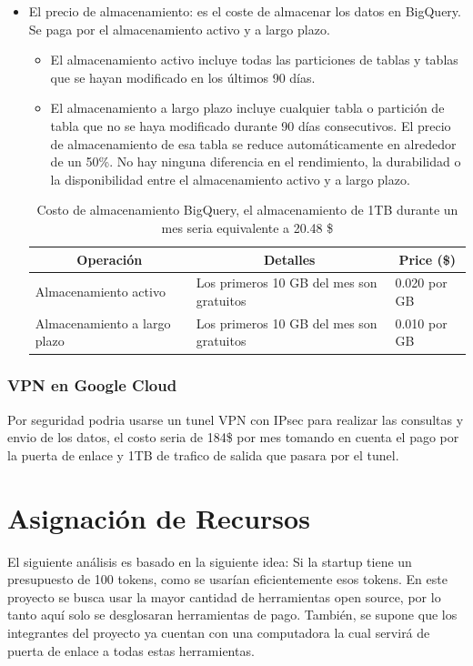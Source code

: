 \documentclass[12pt,a4paper,openright]{article}
\begin{document}
\begin{itemize}
\item El precio de almacenamiento: es el coste de almacenar los datos en BigQuery. Se paga por el almacenamiento activo y a largo plazo.
\begin{itemize}
    \item El almacenamiento activo incluye todas las particiones de tablas y tablas que se hayan modificado en los últimos 90 días.
    \item El almacenamiento a largo plazo incluye cualquier tabla o partición de tabla que no se haya modificado durante 90 días consecutivos. El precio de almacenamiento de esa tabla se reduce automáticamente en alrededor de un 50\%. No hay ninguna diferencia en el rendimiento, la durabilidad o la disponibilidad entre el almacenamiento activo y a largo plazo.
\end{itemize}
\begin{table}[ht]
\begin{adjustbox}{width=\textwidth}
\begin{tabular}{|l|l|l|}
\hline
\multicolumn{1}{|c|}{\textbf{Operación}} & \multicolumn{1}{c|}{\textbf{Detalles}}   & \multicolumn{1}{c|}{\textbf{Price (\$)}} \\ \hline \hline
Almacenamiento activo                    & Los primeros 10 GB del mes son gratuitos & 0.020 por GB                             \\ \hline
Almacenamiento a largo plazo             & Los primeros 10 GB del mes son gratuitos & 0.010 por GB                             \\ \hline
\end{tabular}
\end{adjustbox}
\caption{Costo de almacenamiento BigQuery, el almacenamiento de 1TB durante un mes seria equivalente a 20.48 \$}
\end{table}
\end{itemize}

\subsubsection{VPN en Google Cloud}
Por seguridad podria usarse un tunel VPN con IPsec para realizar las consultas y envio de los datos, el costo seria de 184\$ por mes tomando en cuenta el pago por la puerta de enlace y 1TB de trafico de salida que pasara por el tunel.

\section{Asignaci\'on de Recursos}
El siguiente análisis es basado en la siguiente idea: Si la startup tiene un presupuesto de 100 tokens, como se usarían eficientemente esos tokens. En este proyecto se busca usar la mayor cantidad de herramientas open source, por lo tanto aquí solo se desglosaran herramientas de pago. También, se supone que los integrantes del proyecto ya cuentan con una computadora la cual servirá de puerta de enlace a todas estas herramientas.
\end{document}
